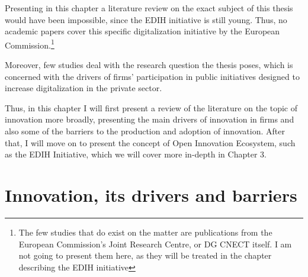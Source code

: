 \documentclass[12pt]{report}
\begin{document}
Presenting in this chapter a literature review on the exact subject of this thesis would have been impossible, since the EDIH initiative is still young. Thus, no academic papers cover this specific digitalization initiative by the European Commission.\footnote{The few studies that do exist on the matter are publications from the European Commission's Joint Research Centre, or DG CNECT itself. I am not going to present them here, as they will be treated in the chapter describing the EDIH initiative}
\par Moreover, few studies deal with the research question the thesis poses, which is concerned with the drivers of firms' participation in public initiatives designed to increase digitalization in the private sector.
\par Thus, in this chapter I will first present a review of the literature on the topic of innovation more broadly, presenting the main drivers of innovation in firms and also some of the barriers to the production and adoption of innovation. After that, I will move on to present the concept of Open Innovation Ecosystem, such as the EDIH Initiative, which we will cover more in-depth in Chapter 3.

\newpage

\section{Innovation, its drivers and barriers}
\end{document}
